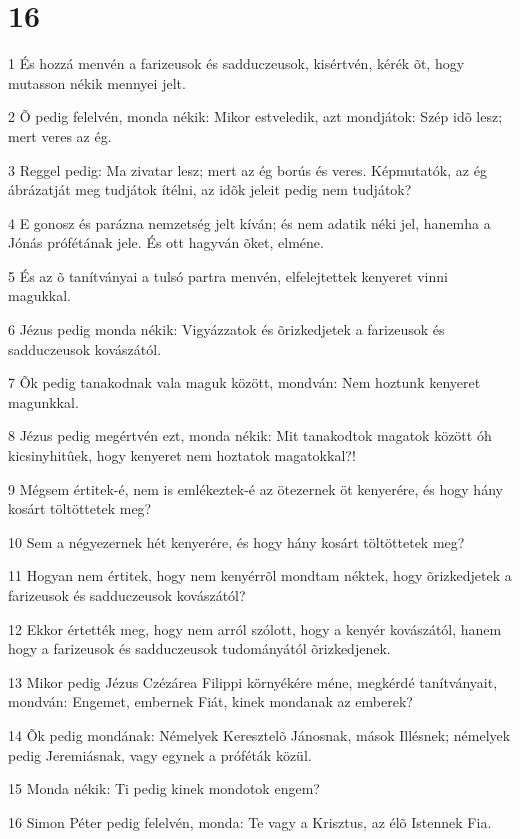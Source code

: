 \chapter{16}

\par 1 És hozzá menvén a farizeusok és sadduczeusok, kisértvén, kérék õt, hogy mutasson nékik mennyei jelt.
\par 2 Õ pedig felelvén, monda nékik: Mikor estveledik, azt mondjátok: Szép idõ lesz; mert veres az ég.
\par 3 Reggel pedig: Ma zivatar lesz; mert az ég borús és veres. Képmutatók, az ég ábrázatját meg tudjátok ítélni, az idõk jeleit pedig nem tudjátok?
\par 4 E gonosz és parázna nemzetség jelt kíván; és nem adatik néki jel, hanemha a Jónás prófétának jele. És ott hagyván õket, elméne.
\par 5 És az õ tanítványai a tulsó partra menvén, elfelejtettek kenyeret vinni magukkal.
\par 6 Jézus pedig monda nékik: Vigyázzatok és õrizkedjetek a farizeusok és sadduczeusok kovászától.
\par 7 Õk pedig tanakodnak vala maguk között, mondván: Nem hoztunk kenyeret magunkkal.
\par 8 Jézus pedig megértvén ezt, monda nékik: Mit tanakodtok magatok között óh kicsinyhitûek, hogy kenyeret nem hoztatok magatokkal?!
\par 9 Mégsem értitek-é, nem is emlékeztek-é az ötezernek öt kenyerére, és hogy hány kosárt töltöttetek meg?
\par 10 Sem a négyezernek hét kenyerére, és hogy hány kosárt töltöttetek meg?
\par 11 Hogyan nem értitek, hogy nem kenyérrõl mondtam néktek, hogy õrizkedjetek a farizeusok és sadduczeusok kovászától?
\par 12 Ekkor értették meg, hogy nem arról szólott, hogy a kenyér kovászától, hanem hogy a farizeusok és sadduczeusok tudományától õrizkedjenek.
\par 13 Mikor pedig Jézus Czézárea Filippi környékére méne, megkérdé tanítványait, mondván: Engemet, embernek Fiát, kinek mondanak az emberek?
\par 14 Õk pedig mondának: Némelyek Keresztelõ Jánosnak, mások  Illésnek; némelyek pedig Jeremiásnak, vagy egynek a próféták közül.
\par 15 Monda nékik: Ti pedig kinek mondotok engem?
\par 16 Simon Péter pedig felelvén, monda: Te vagy a Krisztus, az élõ Istennek Fia.
